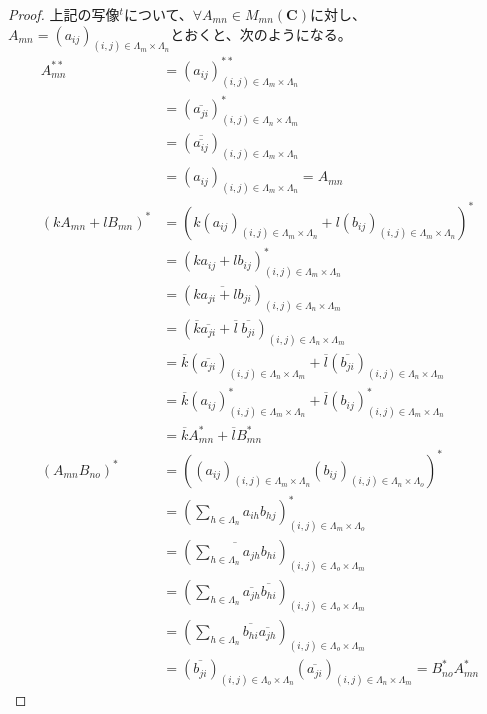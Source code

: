 \documentclass[dvipdfmx]{jsarticle}
\begin{document}
\begin{proof}
上記の写像${}^{t}$について、$\forall A_{mn} \in M_{mn}\left( \mathbf{C} \right)$に対し、$A_{mn} = \left( a_{ij} \right)_{(i,j) \in \varLambda_{m} \times \varLambda_{n}}$とおくと、次のようになる。
\begin{align*}
A_{mn}^{**} &= \left( a_{ij} \right)_{(i,j) \in \varLambda_{m} \times \varLambda_{n}}^{**}\\
&= \left( \overline{a_{ji}} \right)_{(i,j) \in \varLambda_{n} \times \varLambda_{m}}^{*}\\
&= \left( \overline{\overline{a_{ij}}} \right)_{(i,j) \in \varLambda_{m} \times \varLambda_{n}}\\
&= \left( a_{ij} \right)_{(i,j) \in \varLambda_{m} \times \varLambda_{n}} = A_{mn} \\
\left( kA_{mn} + lB_{mn} \right)^{*} &= \left( k\left( a_{ij} \right)_{(i,j) \in \varLambda_{m} \times \varLambda_{n}} + l\left( b_{ij} \right)_{(i,j) \in \varLambda_{m} \times \varLambda_{n}} \right)^{*}\\
&= \left( ka_{ij} + lb_{ij} \right)_{(i,j) \in \varLambda_{m} \times \varLambda_{n}}^{*}\\
&= \left( \overline{ka_{ji} + lb_{ji}} \right)_{(i,j) \in \varLambda_{n} \times \varLambda_{m}}\\
&= \left( \overline{k}\overline{a_{ji}} + \overline{l}\ \overline{b_{ji}} \right)_{(i,j) \in \varLambda_{n} \times \varLambda_{m}}\\
&= \overline{k}\left( \overline{a_{ji}} \right)_{(i,j) \in \varLambda_{n} \times \varLambda_{m}} + \overline{l}\left( \overline{b_{ji}} \right)_{(i,j) \in \varLambda_{n} \times \varLambda_{m}}\\
&= \overline{k}\left( a_{ij} \right)_{(i,j) \in \varLambda_{m} \times \varLambda_{n}}^{*} + \overline{l}\left( b_{ij} \right)_{(i,j) \in \varLambda_{m} \times \varLambda_{n}}^{*}\\
&= \overline{k}A_{mn}^{*} + \overline{l}B_{mn}^{*} \\
\left( A_{mn}B_{no} \right)^{*} &= \left( \left( a_{ij} \right)_{(i,j) \in \varLambda_{m} \times \varLambda_{n}}\left( b_{ij} \right)_{(i,j) \in \varLambda_{n} \times \varLambda_{o}} \right)^{*}\\
&= \left( \sum_{h \in \varLambda_{n}} {a_{ih}b_{hj}} \right)_{(i,j) \in \varLambda_{m} \times \varLambda_{o}}^{*}\\
&= \left( \overline{\sum_{h \in \varLambda_{n}} {a_{jh}b_{hi}}} \right)_{(i,j) \in \varLambda_{o} \times \varLambda_{m}}\\
&= \left( \sum_{h \in \varLambda_{n}} {\overline{a_{jh}}\overline{b_{hi}}} \right)_{(i,j) \in \varLambda_{o} \times \varLambda_{m}}\\
&= \left( \sum_{h \in \varLambda_{n}} {\overline{b_{hi}}\overline{a_{jh}}} \right)_{(i,j) \in \varLambda_{o} \times \varLambda_{m}}\\
&= \left( \overline{b_{ji}} \right)_{(i,j) \in \varLambda_{o} \times \varLambda_{n}}\left( \overline{a_{ji}} \right)_{(i,j) \in \varLambda_{n} \times \varLambda_{m}} = B_{no}^{*}A_{mn}^{*}
\end{align*}
\end{proof}
\end{document}
